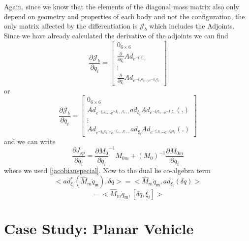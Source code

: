 \documentclass[lettersize,journal]{IEEEtran}
\def \Ad {\textbf{Ad}}
\begin{document}
Again, since we know that the elements of the diagonal mass matrix also only depend on geometry and properties of each body and not the configuration, the only matrix affected by the differentiation is $\mathcal{J}_b$ which includes the Adjoints. Since we have already calculated the derivative of the adjoints we can find
\begin{equation}
    \frac{\partial\mathcal{J}_b}{\partial q_i}=\begin{bmatrix}0_{6\times6}\\\frac{\partial}{\partial q_i}{Ad}_{e^{-\xi_1q_1}}\\\vdots\\\frac{\partial}{\partial q_i}{Ad}_{e^{-\xi_nq_n} \cdots e^{-\xi_1q_1}}  \end{bmatrix}
\end{equation}
or
\begin{equation} \frac{\partial\mathcal{J}_b}{\partial q_i}=\begin{bmatrix}0_{6\times6}\\Ad_{e^{-\xi_2q_2}\cdots e^{-\xi_{i+1}q_{i+1}}}ad_{\xi_i}Ad_{e^{-\xi_iq_i}\cdots e^{-\xi_1q_1}}(.)\\\vdots\\Ad_{e^{-\xi_nq_n}\cdots e^{-\xi_{i+1}q_{i+1}}}ad_{\xi_i}Ad_{e^{-\xi_iq_i}\cdots e^{-\xi_1q_1}}(.) \end{bmatrix}
\end{equation}
and we  can write
\begin{equation}
 \frac{\partial J_{sp}}{\partial q_i}
=\frac{\partial M_0}{\partial q_i}^{-1}M_{0m}+(M_0)^{-1}\frac{\partial M_{0m}}{\partial q_i}
\label{jspderiv}
\end{equation}
where we used \eqref{jacobianspecial}. Now to the dual lie co-algebra term
\begin{equation}
    <ad^{*}_{\xi_i}({\hat{M}_{m}}{}\dot{q}_\mathfrak{m}),\delta q>=<{\hat{M}_{m}}{}\dot{q}_\mathfrak{m},ad_{\xi_i}(\delta q)>
\end{equation}
\begin{equation}
    =<{\hat{M}_{m}}{}\dot{q}_\mathfrak{m},[\delta q, \xi_i]>
\end{equation}







\section{Case Study: Planar Vehicle}
\end{document}
